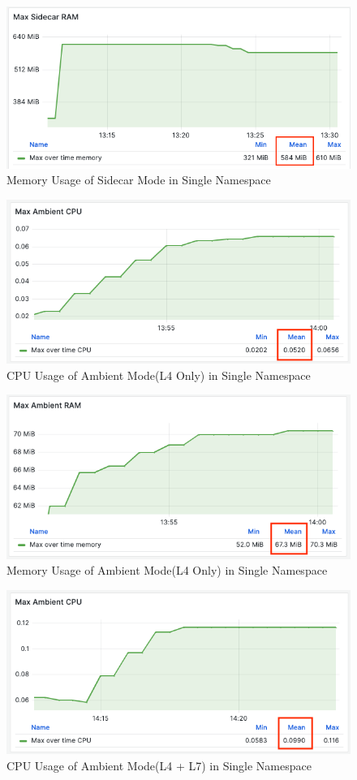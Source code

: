 \begin{figure}[H]
  \centering
  \includegraphics[width=0.8\linewidth]{resources/max-sidecar-mem.png}
  \caption{Memory Usage of Sidecar Mode in Single Namespace}
\end{figure}

\begin{figure}[H]
  \centering
  \includegraphics[width=0.8\linewidth]{resources/max-ambient-l4-cpu.png}
  \caption{CPU Usage of Ambient Mode(L4 Only) in Single Namespace}
\end{figure}

\begin{figure}[H]
  \centering
  \includegraphics[width=0.8\linewidth]{resources/max-ambient-l4-mem.png}
  \caption{Memory Usage of Ambient Mode(L4 Only) in Single Namespace}
\end{figure}

\begin{figure}[H]
  \centering
  \includegraphics[width=0.78\linewidth]{resources/max-ambient-l4-l7-cpu.png}
  \caption{CPU Usage of Ambient Mode(L4 + L7) in Single Namespace}
\end{figure}

